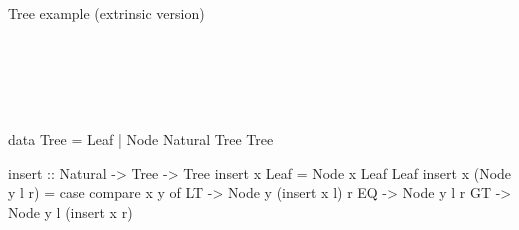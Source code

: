 \documentclass[aspectratio=169]{beamer}
\newcommand\resetVars{
  \def\sourceRatio{.5}
  \def\zoom{1}
  \def\hsFontsize{\normalsize}
  \def\midruleL{-1cm}
  \def\midruleR{.5cm}
  \def\sourceIcon{agda}
}
\def\hsSize{\fpeval{1 - \sourceRatio}}
\def\rightSize{\hsSize\textwidth}
\newcommand\midrule{\hspace{\midruleL}\vrule\hspace{\midruleR}}
\begin{document}
\begin{frame}[fragile]{Tree example (extrinsic version)}
\begin{sourcepage}
\begin{code}
\<%
\\
\>[4][@{}l@{\AgdaIndent{0}}]%
\>[6]\AgdaSymbol{(}\AgdaSpace{}%
\AgdaSymbol{\AgdaUnderscore{})}\AgdaSpace{}%
\AgdaSpace{}%
\AgdaSpace{}%
\AgdaSpace{}%
\AgdaSymbol{(}\AgdaSpace{}%
\AgdaSpace{}%
\AgdaSymbol{)}\AgdaSpace{}%
\<%
\\
%
\>[6]\AgdaSymbol{(}\AgdaSpace{}%
\AgdaSymbol{\AgdaUnderscore{})}\AgdaSpace{}%
\AgdaSpace{}%
\AgdaSpace{}%
\AgdaSpace{}%
\AgdaSpace{}%
\<%
\\
%
\>[6]\AgdaSymbol{(}\AgdaSpace{}%
\AgdaSymbol{\AgdaUnderscore{})}\AgdaSpace{}%
\AgdaSpace{}%
\AgdaSpace{}%
\AgdaSpace{}%
\AgdaSpace{}%
\AgdaSymbol{(}\AgdaSpace{}%
\AgdaSpace{}%
\AgdaSymbol{)}\<%
\\
%
\>[2]\AgdaSymbol{\{-\#}\AgdaSpace{}%
\AgdaSpace{}%
\AgdaSpace{}%
\AgdaSpace{}%
\AgdaSymbol{\#-\}}\<%
\end{code}
\end{sourcepage}
\midrule
\begin{minipage}{\rightSize}
\begin{haskellcode}
data Tree = Leaf
          | Node Natural Tree Tree

insert :: Natural -> Tree -> Tree
insert x Leaf = Node x Leaf Leaf
insert x (Node y l r)
  = case compare x y of
        LT -> Node y (insert x l) r
        EQ -> Node y l r
        GT -> Node y l (insert x r)
\end{haskellcode}
\end{minipage}
\resetVars
\end{frame}
\end{document}
